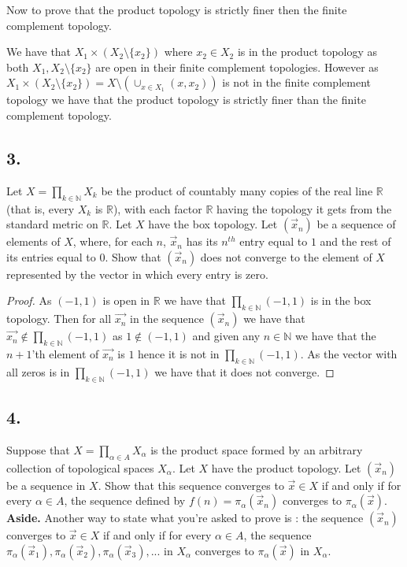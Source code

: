 \documentclass{amsart}
\theoremstyle{plain}
\theoremstyle{definition}
\theoremstyle{remark}
\begin{document}
Now to prove that the product topology is strictly finer then the finite complement topology.

We have that $X_1\times (X_2\setminus \{x_2\})$ where $x_2\in X_2$ is in the product topology as both $X_1,X_2\setminus \{x_2\}$ are open in their finite complement topologies. However as $X_1\times (X_2\setminus \{x_2\})=X\setminus (\cup_{x\in X_1} (x,x_2))$ is not in the finite complement topology we have that the product topology is strictly finer than the finite complement topology.


\vspace{.15in}

\noindent
\subsection*{3.} Let $X =\prod _{k\in \mathbb N} X_k$ be the product of countably many copies of the real line $\mathbb R$  (that is, every $X_k$ is $\mathbb R$), with each factor $\mathbb R$ having the topology it gets from the standard metric on $\mathbb R$. Let $X$ have the box topology. Let $(\vec{x}_n)$ be a sequence of elements of $X$, where, for each $n$, $\vec{x}_n$ has its $n^{th}$ entry equal to $1$ and the rest of its entries equal to $0$.  Show that $(\vec{x}_n)$ does not converge to the element of $X$ represented by the vector in which every entry is zero. 

\begin{proof}

    As $(-1,1)$ is open in $\mathbb{R}$ we have that $\prod_{k\in \mathbb{N}}(-1,1)$ is in the box topology. Then for all $\vec{x_n}$ in the sequence $(\vec x_n)$ we have that $\vec{x_n}\not \in \prod_{k\in \mathbb{N}}(-1,1)$ as $1\not \in (-1,1)$ and given any $n\in \mathbb{N}$ we have that the $n+1$'th element of $\vec{x_n}$ is $1$ hence it is not in $\prod_{k\in \mathbb{N}}(-1,1)$. As the vector with all zeros is in $\prod_{k\in \mathbb{N}}(-1,1)$ we have that it does not converge.

    
\end{proof}



\vspace{.15in}

\noindent
\subsection*{4.} Suppose that  $X = \prod _{\alpha \in A} X_{\alpha}$ is the product space formed by an arbitrary collection of topological spaces $X_{\alpha}$. Let $X$ have the product topology. Let $(\vec{x}_n)$ be a sequence in $X$. Show that this sequence converges to $\vec{x} \in X$ if and only if for every $\alpha \in A$, the sequence defined by $f(n) = \pi _{\alpha} (\vec{x}_n)$ converges to $ \pi _{\alpha} (\vec{x})$. {\bfseries Aside.} Another way to state what you're asked to prove is : the sequence $(\vec{x}_n)$ converges to $\vec{x} \in X$ if and only if for every $\alpha \in A$, the sequence $\pi _{\alpha} (\vec{x}_1) , \pi _{\alpha} (\vec{x}_2), \pi _{\alpha} (\vec{x}_3) , . . . $ in $X_{\alpha}$ converges to $ \pi _{\alpha} (\vec{x})$ in $X_{\alpha}$.
\end{document}
